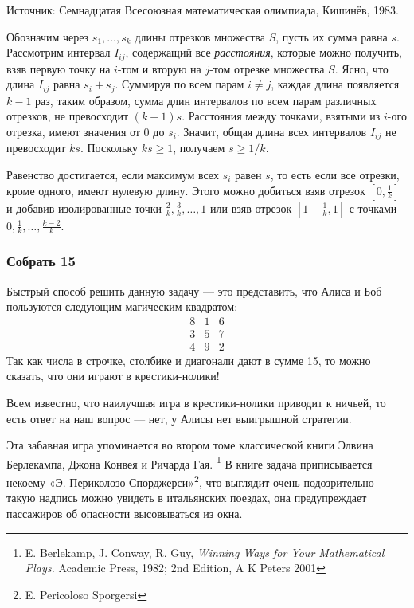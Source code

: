 Источник:
Семнадцатая Всесоюзная математическая олимпиада, Кишинёв, 1983.

\medskip

Обозначим через $s_1,\dots,s_k$ длины отрезков множества $S$,
пусть их сумма равна $s$.
Рассмотрим интервал $I_{ij}$, содержащий все \emph{расстояния}, которые можно получить, взяв первую точку на $i$-том и вторую на $j$-том отрезке множества $S$.
Ясно, что длина $I_{ij}$ равна $s_i+s_j$.
Суммируя по всем парам $i\ne j$, 
каждая длина появляется $k-1$ раз,
таким образом, сумма длин интервалов по всем парам различных отрезков, не превосходит $(k-1) s$.
Расстояния между точками, взятыми из $i$-ого отрезка, имеют значения от $0$ до $s_i$.
Значит, общая длина всех интервалов $I_{ij}$ не превосходит $k s$.
Поскольку $k s\ge 1$, получаем $s\ge 1/k$.
\heart

Равенство достигается, если максимум всех $s_i$ равен $s$, 
то есть если все отрезки, кроме одного, имеют нулевую длину.
Этого можно добиться взяв отрезок $[0,\tfrac1k]$ и добавив изолированные точки
$\tfrac2k,\tfrac3k,\dots,1$ или взяв отрезок $[1-\tfrac1k,1]$ с точками
$0,\tfrac1k,\dots,\tfrac{k-2}k$.

\subsubsection*{Собрать 15} %

Быстрый способ решить данную задачу --- это представить, что Алиса и Боб пользуются следующим магическим квадратом:
$$
\begin{matrix}
8&1&6\\
3&5&7\\
4&9&2
\end{matrix}
$$
Так как числа в строчке, столбике и диагонали дают в сумме 15, то можно сказать, что они играют в крестики-нолики! 

Всем известно, что наилучшая игра в крестики-нолики приводит к ничьей,
то есть ответ на наш вопрос --- нет, у Алисы нет выигрышной стратегии.
\heart

Эта забавная игра упоминается во втором томе классической книги Элвина Берлекампа, Джона Конвея и Ричарда Гая.%
\footnote{E. Berlekamp, J. Conway, R. Guy, \emph{Winning Ways for Your Mathematical Plays.} Academic Press, 1982; 2nd Edition, A K Peters 2001
}
В книге задача приписывается некоему «Э. Периколозо Спорджерси»\footnote{E. Pericoloso Sporgersi}, что выглядит очень подозрительно --- такую надпись можно увидеть в итальянских поездах, она предупреждает пассажиров об опасности высовываться из окна.
